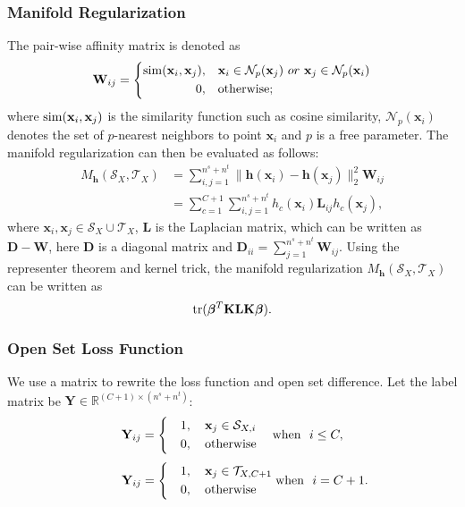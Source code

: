 \documentclass[journal]{IEEEtran}
\begin{document}
\subsubsection{Manifold Regularization}
 The pair-wise affinity matrix is denoted as 
 \begin{equation*}
\mathbf{W}_{ij}=\left\{
\begin{aligned}
{\rm sim}(\mathbf{x}_i,\mathbf{x}_{j}), &~~~ \mathbf{x}_i \in \mathcal{N}_p(\mathbf{x}_{j})~or~\mathbf{x}_j\in \mathcal{N}_p(\mathbf{x}_i)  \\
0,  & ~~~\rm otherwise;
\end{aligned}
\right.
\end{equation*}
 where ${\rm sim}(\mathbf{x}_i,\mathbf{x}_{j})$ is the similarity function such as cosine similarity, $\mathcal{N}_p(\mathbf{x}_i)$ denotes the set of $p$-nearest neighbors to point $\mathbf{x}_i$ and $p$ is a free parameter.
The manifold regularization can then be evaluated as follows:
\begin{equation*}
\begin{split}
    M_{\bm h}(\mathcal{S}_X,\mathcal{T}_X)&=
    \sum^{n^s+n^t}_{i,j=1}\|{\bm h}(\mathbf{x}_i)-{\bm h}(\mathbf{x}_{j})\|_2^2\mathbf{W}_{ij}\\&=\sum_{c=1}^{C+1}\sum^{n^s+n^t}_{i,j=1}{ h}_c(\mathbf{x}_i)\mathbf{L}_{ij}{h}_c(\mathbf{x}_{j}),
    \end{split}
\end{equation*}
where $\mathbf{x}_{i},\mathbf{x}_{j}\in \mathcal{S}_X\cup \mathcal{T}_X$, $\mathbf{L}$ is the  Laplacian matrix, which can be written as $\mathbf{D-W}$, here $\mathbf{D}$ is a diagonal matrix and $\mathbf{D}_{ii}=\sum_{j=1}^{n^s+n^t}\mathbf{W}_{ij}$. Using the representer theorem and kernel trick, the manifold  regularization $M_{\bm h}(\mathcal{S}_X,\mathcal{T}_X)$ can be written as
\begin{equation}\label{11}
    {\rm tr}({\bm {\bm \beta}}^T\mathbf{KLK}{\bm {\bm \beta}}).
\end{equation}

\subsubsection{Open Set Loss Function} We use a matrix to rewrite the loss function and open set difference. Let the label matrix be 
$\mathbf{Y}\in \mathbb{R}^{(C+1)\times(n^s+n^t)}$:
\begin{equation}\label{Y}
\mathbf{Y}_{ij}=\left\{
\begin{aligned}
&~~~1,~~~ \mathbf{x}_j \in\mathcal{S}_{X,i} \\
&~~~0,~~~\rm otherwise
\end{aligned}
\right.
~~~{\rm when} ~~i\leq C,
\end{equation}
\begin{equation}\label{Y1}
~~~~~~\mathbf{Y}_{ij}=\left\{
\begin{aligned}
&~~~1,~~~ \mathbf{x}_j \in\mathcal{T}_{X,C+1} \\
&~~~0,~~~\rm otherwise
\end{aligned}
\right.
{\rm when} ~~i= C+1.
\end{equation}
\end{document}
